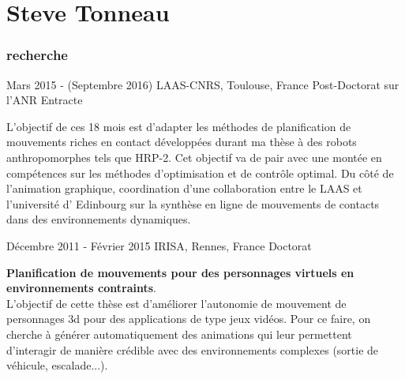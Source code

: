 \documentclass{tccv}
\begin{document}
\part{Steve Tonneau}

\section{recherche}

\begin{eventlist}

\item{ Mars 2015 - (Septembre 2016)}
     {LAAS-CNRS, Toulouse, France}
     {Post-Doctorat sur l'ANR Entracte}
     
     L'objectif de ces 18 mois est d'adapter les m\'ethodes de planification de mouvements riches en contact d\'evelop\-p\'ees durant ma th\`ese 
     \`a des robots anthropomorphes tels que HRP-2. Cet objectif va de pair avec une mont\'ee en comp\'etences sur les m\'ethodes d'optimisation et de contr\^ole optimal.
     Du c\^ot\'e de l'animation graphique, coordination d'une collaboration entre le LAAS et l'universit\'e d' Edinbourg sur la synth\`ese en ligne de mouvements de contacts
     dans des environnements dynamiques.

\item{ D\'ecembre 2011 - F\'evrier 2015}
     {IRISA, Rennes, France}
     {Doctorat}
	 
 \textbf{Planification de mouvements pour des personnages virtuels en environnements contraints}.\\
 L'objectif de cette th\`{e}se est d'am\'{e}liorer l'autonomie de mouvement de personnages 3d pour des applications 
 de type jeux vid\'{e}os. Pour ce faire, on cherche \`{a} g\'{e}n\'{e}rer automatiquement des animations qui leur permettent d'interagir de mani\`{e}re
 cr\'{e}\-dible avec des environnements complexes (sortie de v\'ehicule, escalade...).



\end{eventlist}
\end{document}
